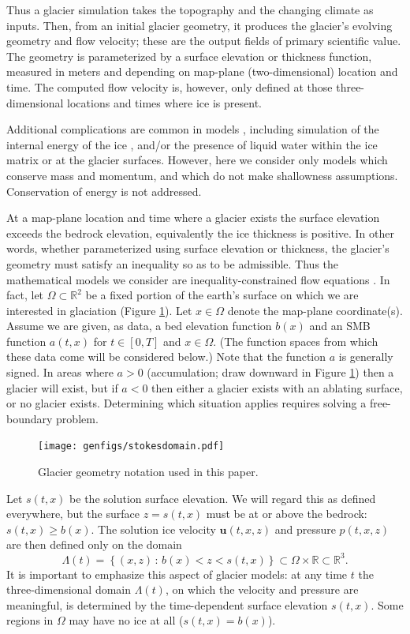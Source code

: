 \documentclass[hidelinks,onefignum,onetabnum,final]{siamart220329}  %
\newcommand{\RR}{\mathbb{R}}
\newcommand{\bu}{\mathbf{u}}
\begin{document}
Thus a glacier simulation takes the topography and the changing climate as inputs.  Then, from an initial glacier geometry, it produces the glacier's evolving geometry and flow velocity; these are the output fields of primary scientific value.  The geometry is parameterized by a surface elevation or thickness function, measured in meters and depending on map-plane (two-dimensional) location and time.  The computed flow velocity is, however, only defined at those three-dimensional locations and times where ice is present.

Additional complications are common in models \cite{GreveBlatter2009}, including simulation of the internal energy of the ice \cite{Aschwandenetal2012}, and/or the presence of liquid water within the ice matrix or at the glacier surfaces.  However, here we consider only models which conserve mass and momentum, and which do not make shallowness assumptions.  Conservation of energy is not addressed.

At a map-plane location and time where a glacier exists the surface elevation exceeds the bedrock elevation, equivalently the ice thickness is positive.  In other words, whether parameterized using surface elevation or thickness, the glacier's geometry must satisfy an inequality so as to be admissible.  Thus the mathematical models we consider are inequality-constrained flow equations \cite{Bueler2021conservation}.  In fact, let $\Omega \subset \RR^2$ be a fixed portion of the earth's surface on which we are interested in glaciation (Figure \ref{fig:stokesdomain}).  Let $x\in\Omega$ denote the map-plane coordinate(s).  Assume we are given, as data, a bed elevation function $b(x)$ and an SMB function $a(t,x)$ for $t\in [0,T]$ and $x\in \Omega$.  (The function spaces from which these data come will be considered below.)  Note that the function $a$ is generally signed.  In areas where $a>0$ (accumulation; draw downward in Figure \ref{fig:stokesdomain}) then a glacier will exist, but if $a<0$ then either a glacier exists with an ablating surface, or no glacier exists.  Determining which situation applies requires solving a free-boundary problem.

\medskip
\begin{figure}[ht]
\centering
\texttt{[image: genfigs/stokesdomain.pdf]}
\caption{Glacier geometry notation used in this paper.}
\label{fig:stokesdomain}
\end{figure}

\medskip
Let $s(t,x)$ be the solution surface elevation.  We will regard this as defined everywhere, but the surface $z=s(t,x)$ must be at or above the bedrock: $s(t,x) \ge b(x)$.  The solution ice velocity $\bu(t,x,z)$ and pressure $p(t,x,z)$ are then defined only on the domain
\begin{equation}
\Lambda(t) = \left\{(x,z)\,:\,b(x) < z < s(t,x)\right\} \subset \Omega \times \RR \subset \RR^3. \label{eq:icydomain}
\end{equation}
It is important to emphasize this aspect of glacier models: at any time $t$ the three-dimensional domain $\Lambda(t)$, on which the velocity and pressure are meaningful, is determined by the time-dependent surface elevation $s(t,x)$.  Some regions in $\Omega$ may have no ice at all ($s(t,x)=b(x)$).
\end{document}
